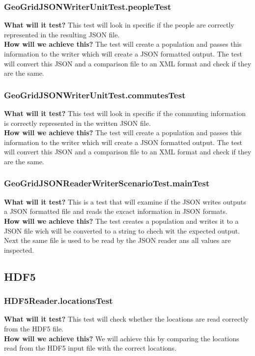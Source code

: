 \documentclass{article}
\begin{document}
\subsubsection{GeoGridJSONWriterUnitTest.peopleTest}
\textbf{What will it test?}
This test will look in specific if the people are correctly represented in the resulting JSON file.\\
\newline
\textbf{How will we achieve this?}
The test will create a population and passes this information to the writer which will create a JSON formatted output. The test will convert this JSON and a comparison file to an XML format and check if they are the same.

\subsubsection{GeoGridJSONWriterUnitTest.commutesTest}
\textbf{What will it test?}
This test will look in specific if the commuting information is correctly represented in the written JSON file.\\
\newline
\textbf{How will we achieve this?}
The test will create a population and passes this information to the writer which will create a JSON formatted output. The test will convert this JSON and a comparison file to an XML format and check if they are the same.

\subsubsection{GeoGridJSONReaderWriterScenarioTest.mainTest}
\textbf{What will it test?}
This is a test that will examine if the JSON writes outputs a JSON formatted file and reads the excact information in JSON formats.\\
\newline
\textbf{How will we achieve this?}
The test creates a population and writes it to a JSON file wich will be converted to a string to chech wit the expected output. Next the same file is used to be read by the JSON reader ans all values are inspected.

\subsection{HDF5}
\subsubsection{HDF5Reader.locationsTest}
\textbf{What will it test?}
This test will check whether the locations are read correctly from the HDF5 file. \\
\newline
\textbf{How will we achieve this?}
We will achieve this by comparing the locations read from the HDF5 input file with the correct locations.
\end{document}
